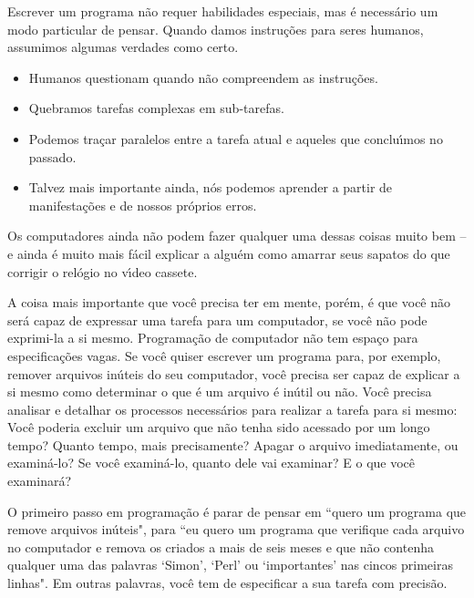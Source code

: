 \documentclass[a4paper,12pt,twoside]{book}
\begin{document}
  \noindent Escrever um programa n\~ao requer habilidades especiais, mas \'e necess\'ario 
  um modo particular de pensar. Quando damos instru\c{c}\~oes para seres humanos, assumimos 
  algumas verdades como certo.

  \begin{itemize}

    \item Humanos questionam quando n\~ao compreendem as instru\c{c}\~oes.

    \item Quebramos tarefas complexas em sub-tarefas.

    \item Podemos tra\c{c}ar paralelos entre a tarefa atual e aqueles que conclu\'{\i}mos no passado.

    \item Talvez mais importante ainda, n\'os podemos aprender a partir de manifesta\c{c}\~oes e de nossos pr\'oprios erros.

  \end{itemize} 

  \noindent Os computadores ainda n\~ao podem fazer qualquer uma dessas coisas 
  muito bem – e ainda \'e muito mais f\'acil explicar a algu\'em como amarrar 
  seus sapatos do que corrigir o rel\'ogio no v\'{\i}deo cassete.\medskip

  \noindent A coisa mais importante que voc\^e precisa ter em mente, por\'em, 
  \'e que voc\^e n\~ao ser\'a capaz de expressar uma tarefa para um computador, 
  se voc\^e n\~ao pode exprimi-la a si mesmo. Programa\c{c}\~ao de computador 
  n\~ao tem espa\c{c}o para especifica\c{c}\~oes vagas. Se voc\^e quiser escrever 
  um programa para, por exemplo, remover arquivos in\'uteis do seu computador, 
  voc\^e precisa ser capaz de explicar a si mesmo como determinar o que \'e um 
  arquivo \'e in\'util ou n\~ao. Voc\^e precisa analisar e detalhar os processos 
  necess\'arios para realizar a tarefa para si mesmo: Voc\^e poderia excluir um 
  arquivo que n\~ao tenha sido acessado por um longo tempo? Quanto tempo, mais 
  precisamente? Apagar o arquivo imediatamente, ou examin\'a-lo? Se voc\^e examin\'a-lo, 
  quanto dele vai examinar? E o que voc\^e examinar\'a?\medskip

  \noindent O primeiro passo em programa\c{c}\~ao \'e parar de pensar em 
  ``quero um programa que remove arquivos in\'uteis", para ``eu quero um 
  programa que verifique cada arquivo no computador e remova os criados 
  a mais de seis meses e que n\~ao contenha qualquer uma das palavras `Simon', 
  `Perl' ou `importantes' nas cincos primeiras linhas". Em outras palavras, 
  voc\^e tem de especificar a sua tarefa com precis\~ao.\medskip
\end{document}
